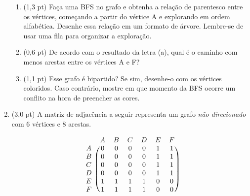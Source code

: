 \documentclass[a4paper,10pt]{article}
\begin{document}
\begin{multicols*}{2}
\begin{enumerate}
\begin{center}
  \end{center}

  \begin{enumerate}
    \item (1,3 pt) Faça uma BFS no grafo e obtenha a relação de parentesco entre os vértices, começando a partir do vértice A e explorando em ordem alfabética. Desenhe essa relação em um formato de árvore. Lembre-se de usar uma fila para organizar a exploração.
    \item (0,6 pt) De acordo com o resultado da letra (a), qual é o caminho com menos arestas entre os vértices A e F?
    \item (1,1 pt) Esse grafo é bipartido? Se sim, desenhe-o com os vértices coloridos. Caso contrário, mostre em que momento da BFS ocorre um conflito na hora de preencher as cores.
  \end{enumerate}

  \item (3,0 pt) A matriz de adjacência a seguir representa um grafo \textit{não direcionado} com 6 vértices e 8 arestas.

  \begin{equation*}
    \begin{blockarray}{ccccccc}
      & A & B & C & D & E & F \\
      \begin{block}{c(cccccc)}
        A & 0 & 0 & 0 & 0 & 1 & 1 \\
        B & 0 & 0 & 0 & 0 & 1 & 1 \\
        C & 0 & 0 & 0 & 0 & 1 & 1 \\
        D & 0 & 0 & 0 & 0 & 1 & 1 \\
        E & 1 & 1 & 1 & 1 & 0 & 0 \\
        F & 1 & 1 & 1 & 1 & 0 & 0 \\
      \end{block}
      \end{blockarray}
  \end{equation*}


\end{enumerate}
\end{multicols*}
\end{document}
